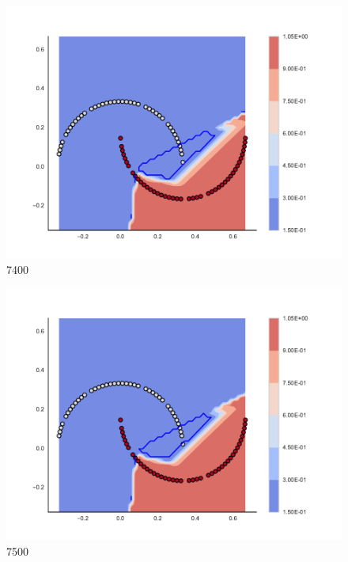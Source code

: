\begin{subfigure}[b]{0.09\textwidth}
    \includegraphics[clip, trim=2.35cm 1.75cm 4.5cm 0cm,width=\textwidth]{img/convergence/7400.pdf}
    \caption{7400}
    \label{fig:convergence_7400}
\end{subfigure}
%
\begin{subfigure}[b]{0.09\textwidth}
    \includegraphics[clip, trim=2.35cm 1.75cm 4.5cm 0cm,width=\textwidth]{img/convergence/7500.pdf}
    \caption{7500}
    \label{fig:convergence_7500}
\end{subfigure}
%
